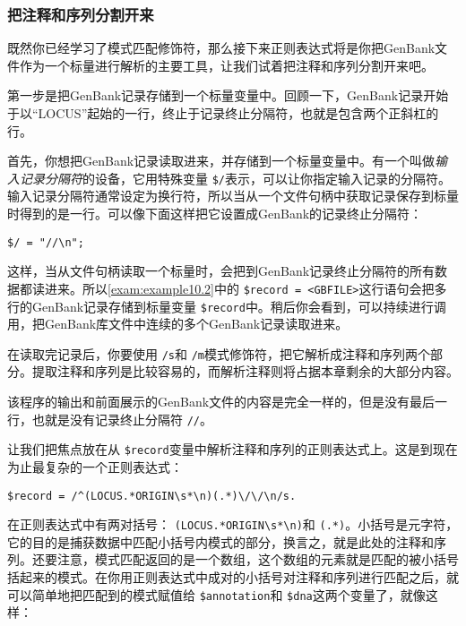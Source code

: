 \subsubsection{把注释和序列分割开来}
既然你已经学习了模式匹配修饰符，那么接下来正则表达式将是你把GenBank文件作为一个标量进行解析的主要工具，让我们试着把注释和序列分割开来吧。

第一步是把GenBank记录存储到一个标量变量中。回顾一下，GenBank记录开始于以“LOCUS”起始的一行，终止于记录终止分隔符，也就是包含两个正斜杠的行。

首先，你想把GenBank记录读取进来，并存储到一个标量变量中。有一个叫做\textit{输入记录分隔符}的设备，它用特殊变量 \verb|$/|表示，可以让你指定输入记录的分隔符。输入记录分隔符通常设定为换行符，所以当从一个文件句柄中获取记录保存到标量时得到的是一行。可以像下面这样把它设置成GenBank的记录终止分隔符：

\begin{lstlisting}
$/ = "//\n";
\end{lstlisting}

这样，当从文件句柄读取一个标量时，会把到GenBank记录终止分隔符的所有数据都读进来。所以\autoref{exam:example10.2}中的 \verb|$record = <GBFILE>|这行语句会把多行的GenBank记录存储到标量变量 \verb|$record|中。稍后你会看到，可以持续进行调用，把GenBank库文件中连续的多个GenBank记录读取进来。

在读取完记录后，你要使用 \verb|/s|和 \verb|/m|模式修饰符，把它解析成注释和序列两个部分。提取注释和序列是比较容易的，而解析注释则将占据本章剩余的大部分内容。



该程序的输出和前面展示的GenBank文件的内容是完全一样的，但是没有最后一行，也就是没有记录终止分隔符 \verb|//|。

让我们把焦点放在从 \verb|$record|变量中解析注释和序列的正则表达式上。这是到现在为止最复杂的一个正则表达式：

\begin{lstlisting}
$record = /^(LOCUS.*ORIGIN\s*\n)(.*)\/\/\n/s.
\end{lstlisting}

在正则表达式中有两对括号： \verb|(LOCUS.*ORIGIN\s*\n)|和 \verb|(.*)|。小括号是元字符，它的目的是捕获数据中匹配小括号内模式的部分，换言之，就是此处的注释和序列。还要注意，模式匹配返回的是一个数组，这个数组的元素就是匹配的被小括号括起来的模式。在你用正则表达式中成对的小括号对注释和序列进行匹配之后，就可以简单地把匹配到的模式赋值给 \verb|$annotation|和 \verb|$dna|这两个变量了，就像这样：

